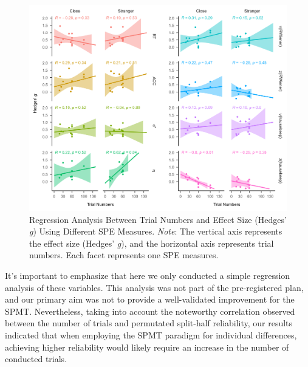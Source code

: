 \documentclass[sn-apa]{sn-jnl}%
\theoremstyle{thmstyleone}%
\theoremstyle{thmstyletwo}%
\theoremstyle{thmstylethree}%
\begin{document}
\begin{figure}[!ht]
	\centering
	\includegraphics[width=1\textwidth]{./Figure/Fig9_cor_yi&trials.png} 
	\caption[Regression Analysis Between Trial Numbers and Effect Size (Hedges’ \textit{g}) Using Different SPE Measures]{Regression Analysis Between Trial Numbers and Effect Size (Hedges’ \textit{g}) Using Different SPE Measures.  \textit{Note}: The vertical axis represents the effect size (Hedges’ \textit{g}), and the horizontal axis represents trial numbers. Each facet represents one SPE measures.
	}\label{fig:g_nTrial}
\end{figure}

It's important to emphasize that here we only conducted a simple regression analysis of these variables. This analysis was not part of the pre-registered plan, and our primary aim was not to provide a well-validated improvement for the SPMT. Nevertheless, taking into account the noteworthy correlation observed between the number of trials and permutated split-half reliability, our results indicated that when employing the SPMT paradigm for individual differences, achieving higher reliability would likely require an increase in the number of conducted trials.
\clearpage
\printbibliography
\end{document}

